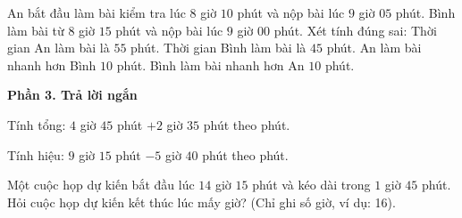 \begin{ex} %
An bắt đầu làm bài kiểm tra lúc $8$ giờ $10$ phút và nộp bài lúc $9$ giờ $05$ phút. Bình làm bài từ $8$ giờ $15$ phút và nộp bài lúc $9$ giờ $00$ phút. Xét tính đúng sai:
\choiceTF
{\True Thời gian An làm bài là $55$ phút.}
{\True Thời gian Bình làm bài là $45$ phút.}
{An làm bài nhanh hơn Bình $10$ phút.}
{\True Bình làm bài nhanh hơn An $10$ phút.}
\end{ex}

\textbf{Phần 3. Trả lời ngắn}

\begin{ex} %
Tính tổng: $4$ giờ $45$ phút $+ 2$ giờ $35$ phút theo phút.
\end{ex}

\begin{ex} %
Tính hiệu: $9$ giờ $15$ phút $- 5$ giờ $40$ phút theo phút.
\end{ex}

\begin{ex} %
Một cuộc họp dự kiến bắt đầu lúc $14$ giờ $15$ phút và kéo dài trong $1$ giờ $45$ phút. Hỏi cuộc họp dự kiến kết thúc lúc mấy giờ? (Chỉ ghi số giờ, ví dụ: 16).
\end{ex}

